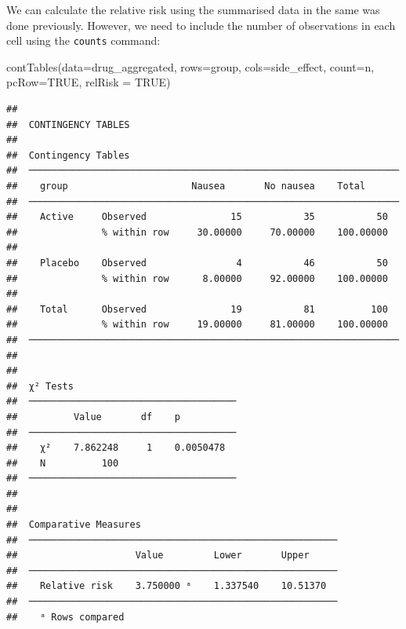 \documentclass[
]{memoir}
\newenvironment{Shaded}{\begin{snugshade}}{\end{snugshade}}
\newcommand{\AttributeTok}[1]{\textcolor[rgb]{0.77,0.63,0.00}{#1}}
\newcommand{\ConstantTok}[1]{\textcolor[rgb]{0.00,0.00,0.00}{#1}}
\newcommand{\FunctionTok}[1]{\textcolor[rgb]{0.00,0.00,0.00}{#1}}
\newcommand{\NormalTok}[1]{#1}
\begin{document}
We can calculate the relative risk using the summarised data in the same was done previously. However, we need to include the number of observations in each cell using the \texttt{counts} command:

\begin{Shaded}
\begin{Highlighting}[]
\FunctionTok{contTables}\NormalTok{(}\AttributeTok{data=}\NormalTok{drug\_aggregated,}
           \AttributeTok{rows=}\NormalTok{group, }\AttributeTok{cols=}\NormalTok{side\_effect, }\AttributeTok{count=}\NormalTok{n,}
           \AttributeTok{pcRow=}\ConstantTok{TRUE}\NormalTok{, }\AttributeTok{relRisk =} \ConstantTok{TRUE}\NormalTok{)}
\end{Highlighting}
\end{Shaded}

\begin{verbatim}
## 
##  CONTINGENCY TABLES
## 
##  Contingency Tables                                                 
##  ────────────────────────────────────────────────────────────────── 
##    group                      Nausea       No nausea    Total       
##  ────────────────────────────────────────────────────────────────── 
##    Active     Observed               15           35           50   
##               % within row     30.00000     70.00000    100.00000   
##                                                                     
##    Placebo    Observed                4           46           50   
##               % within row      8.00000     92.00000    100.00000   
##                                                                     
##    Total      Observed               19           81          100   
##               % within row     19.00000     81.00000    100.00000   
##  ────────────────────────────────────────────────────────────────── 
## 
## 
##  χ² Tests                              
##  ───────────────────────────────────── 
##          Value       df    p           
##  ───────────────────────────────────── 
##    χ²    7.862248     1    0.0050478   
##    N          100                      
##  ───────────────────────────────────── 
## 
## 
##  Comparative Measures                                    
##  ─────────────────────────────────────────────────────── 
##                     Value         Lower       Upper      
##  ─────────────────────────────────────────────────────── 
##    Relative risk    3.750000 ᵃ    1.337540    10.51370   
##  ─────────────────────────────────────────────────────── 
##    ᵃ Rows compared
\end{verbatim}
\end{document}
